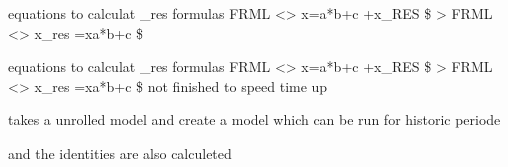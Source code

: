 \documentclass[letterpaper,10pt,english]{sphinxmanual}
\begin{document}

\begin{fulllineitems}
\label{\detokenize{onboard/modelmanipulation:modelmanipulation.find_res_dynare}}
\pysigstartsignatures
{}
\pysigstopsignatures
\sphinxAtStartPar
equations to calculat \_res formulas
FRML \textless{}\textgreater{} x=a*b+c +x\_RES  \$ \sphinxhyphen{}\textgreater{} FRML \textless{}\textgreater{} x\_res =x\sphinxhyphen{}a*b+c  \$

\end{fulllineitems}


\begin{fulllineitems}
\label{\detokenize{onboard/modelmanipulation:modelmanipulation.find_res_dynare_new}}
\pysigstartsignatures
{}
\pysigstopsignatures
\sphinxAtStartPar
equations to calculat \_res formulas
FRML \textless{}\textgreater{} x=a*b+c +x\_RES  \$ \sphinxhyphen{}\textgreater{} FRML \textless{}\textgreater{} x\_res =x\sphinxhyphen{}a*b+c  \$
not finished to speed time up

\end{fulllineitems}


\begin{fulllineitems}
\label{\detokenize{onboard/modelmanipulation:modelmanipulation.find_hist_model}}
\pysigstartsignatures
{}
\pysigstopsignatures
\sphinxAtStartPar
takes a unrolled model and create a model which can be run for historic periode

\sphinxAtStartPar
and the identities are also calculeted

\end{fulllineitems}
\end{document}
